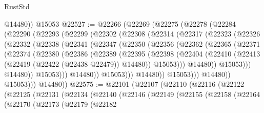 \begin{lexlean}{RustStd}
\begin{coremodule}
        @14480))
    @15053
@22527 := @22266
    (@22269
      (@22275
        (@22278
          (@22284
            (@22290
              (@22293
                (@22299
                  (@22302
                    (@22308
                      (@22314
                        (@22317
                          (@22323
                            (@22326
                              (@22332
                                (@22338
                                  (@22341
                                    (@22347
                                      (@22350
                                        (@22356
                                          (@22362
                                            (@22365
                                              (@22371
                                                (@22374
                                                  (@22380
                                                    (@22386
                                                      (@22389
                                                        (@22395
                                                          (@22398
                                                            (@22404
                                                              (@22410
                                                                (@22413
                                                                  (@22419
                                                                    (@22422 (@22438 @22479))
                                                                    @14480))
                                                                @15053)))
                                                          @14480))
                                                      @15053)))
                                                @14480))
                                            @15053)))
                                      @14480))
                                  @15053)))
                            @14480))
                        @15053)))
                  @14480))
              @15053)))
        @14480))
@22575 := @22101
    (@22107
      (@22110
        (@22116
          (@22122
            (@22125
              (@22131
                (@22134
                  (@22140
                    (@22146
                      (@22149
                        (@22155
                          (@22158
                            (@22164
                              (@22170
                                (@22173
                                  (@22179
                                    (@22182

\end{coremodule}
\end{lexlean}
